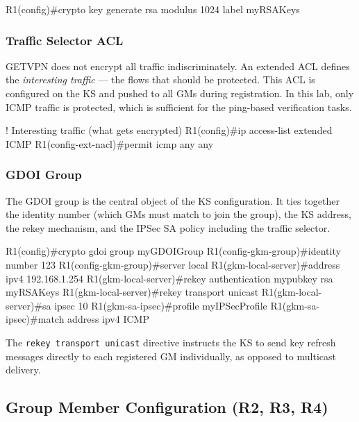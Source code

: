 \documentclass[12pt]{article}
\begin{document}
\begin{configbox}
R1(config)#crypto key generate rsa modulus 1024 label myRSAKeys
\end{configbox}

\subsubsection{Traffic Selector ACL}

GETVPN does not encrypt all traffic indiscriminately. An extended ACL defines the \textit{interesting traffic} — the flows that should be protected. This ACL is configured on the KS and pushed to all GMs during registration. In this lab, only ICMP traffic is protected, which is sufficient for the ping-based verification tasks.

\begin{configbox}
! Interesting traffic (what gets encrypted)
R1(config)#ip access-list extended ICMP
R1(config-ext-nacl)#permit icmp any any
\end{configbox}

\subsubsection{GDOI Group}

The GDOI group is the central object of the KS configuration. It ties together the identity number (which GMs must match to join the group), the KS address, the rekey mechanism, and the IPSec SA policy including the traffic selector.

\begin{configbox}
R1(config)#crypto gdoi group myGDOIGroup
R1(config-gkm-group)#identity number 123
R1(config-gkm-group)#server local
R1(gkm-local-server)#address ipv4 192.168.1.254
R1(gkm-local-server)#rekey authentication mypubkey rsa myRSAKeys
R1(gkm-local-server)#rekey transport unicast
R1(gkm-local-server)#sa ipsec 10
R1(gkm-sa-ipsec)#profile myIPSecProfile
R1(gkm-sa-ipsec)#match address ipv4 ICMP
\end{configbox}

The \texttt{rekey transport unicast} directive instructs the KS to send key refresh messages directly to each registered GM individually, as opposed to multicast delivery.

\subsection{Group Member Configuration (R2, R3, R4)}
\end{document}
